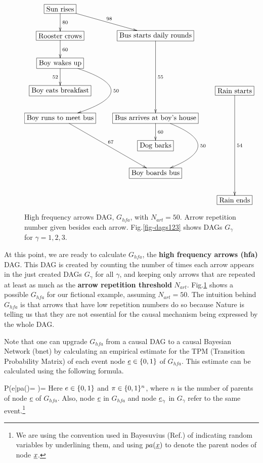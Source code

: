 \documentclass[12pt]{article}
\begin{document}
\begin{figure}[h!]
$$
\xymatrix{
*+[F]{\rm \SuRi}\ar[d]^{80}\ar[dr]^{98}
\\
*+[F]{\rm\RoCr}\ar[d]^{60} & *+[F]{\rm\BuSt}\ar[ddd]^{55}
\\
*+[F]{\rm\BoWa}\ar[d]_{52}\ar@/^6pc/[dd]^{50}
\\
*+[F]{\rm\BoEa}
&&*+[F]{\rm\RaSt}\ar[dddd]^{54}
\\
*+[F]{\rm\BoRu}\ar[ddr]^{67}
&*+[F]{\rm\BuAr}\ar[d]^{60}\ar@/^5pc/[dd]^{50}
\\
&*+[F]{\rm\DoBa}
\\
&*+[F]{\rm\BoBo}
\\
&&*+[F]{\rm\RaEn}
}
$$
\caption{
High frequency arrows DAG, $G_{hfa}$,
 with $N_{art} = 50$.
Arrow repetition number
given besides each arrow.
Fig.\ref{fig-dags123}
shows DAGs 
$G_\gamma$ for $\gamma=1,2,3$.
}
\label{fig-hf-dag}
\end{figure}

At this point, we are ready 
to calculate $G_{hfa}$,
the {\bf high frequency arrows (hfa)} DAG.
This DAG is created
by counting the 
number of times each arrow
appears in the 
just created DAGs $G_\gamma$
for all $\gamma$, 
and keeping 
only arrows that are repeated
at least as much as
the {\bf arrow repetition threshold} $N_{art}$. 
Fig.\ref{fig-hf-dag}
shows a possible $G_{hfa}$
for our fictional 
example, assuming $N_{art}=50$.
The intuition behind
$G_{hfa}$ is that
arrows that have low repetition numbers do so because Nature is telling us that they are not essential for the causal mechanism being expressed by the whole DAG. 


Note that one can upgrade $G_{hfa}$
from a causal DAG to
a causal Bayesian Network (bnet)
by calculating  an 
empirical estimate 
for the
 TPM (Transition Probability Matrix)
 of each event node ${\underline{e}}\in \{0,1\}$
 of $G_{hfa}$.
 This estimate can be calculated using the following 
 formula.
 
 \beq
 P(e|pa(\rve)= \pi )=
 \eeq
 Here $e\in \{0,1\}$ and 
 $\pi\in \{0,1\}^n$,
 where $n$
 is the number of parents of node ${\underline{e}}$
 of $G_{hfa}$.
 Also, node ${\underline{e}}$ in $G_{hfa}$
 and node ${\underline{e}}_\gamma$ in $G_\gamma$
 refer to the same event.\footnote{
 We are using the 
 convention
 used in Bayesuvius (Ref.\cite{bayesuvius})
 of indicating random  variables
 by underlining them,
 and using $pa({\underline{x}})$
 to denote the parent nodes
 of node ${\underline{x}}$.}
 
\end{document}
